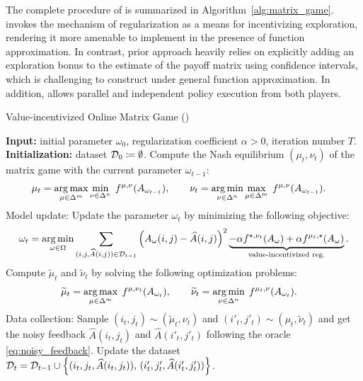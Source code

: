 The complete procedure of \name is summarized in Algorithm~\ref{alg:matrix_game}. \name invokes the mechanism of regularization as a means for incentivizing exploration, rendering it more amenable to implement in the presence of function approximation. In contrast, prior approach \citep{o2021matrix} heavily relies on 
explicitly adding an exploration bonus to the estimate of the payoff matrix using confidence intervals, which is challenging to construct under general function approximation. In addition, \name allows parallel and independent policy execution from both players.


 
\begin{algorithm}[th]
    \caption{Value-incentivized Online Matrix Game (\name)}
    \label{alg:matrix_game}
    \begin{algorithmic}[1]
    \STATE \textbf{Input:}  initial parameter $\omega_0$, regularization coefficient $\alpha>0$, iteration number $T$.  
    \STATE \textbf{Initialization:} dataset ${\mathcal{D}}_0\coloneqq \emptyset$.
    \STATE 
    Compute the Nash equilibrium $(\mu_t,\nu_t)$ of  the matrix game with the current parameter $\omega_{t-1}$:
    \begin{align}\label{eq:policy_update}
        \mu_t&=\operatorname*{arg\,max}_{\mu\in\Delta^m}\min_{\nu\in\Delta^n}\; f^{\mu,\nu}(A_{\omega_{t-1}}),\qquad \nu_t=\operatorname*{arg\,min}_{\nu\in\Delta^n}\max_{\mu\in\Delta^m}\; f^{\mu,\nu}(A_{\omega_{t-1}}).
    \end{align} 
    \STATE Model update: Update the parameter $\omega_t$ by minimizing the following objective:
    \begin{align}\label{eq:model_update}
        \omega_t=\operatorname*{arg\,min}_{\omega\in\Omega}\sum_{(i,j,\widehat{A}(i,j))\in{\mathcal{D}}_{t-1}}\left(A_\omega(i,j)-\widehat{A}(i,j)\right)^2  \underbrace{ -\alpha f^{\star, \nu_t}(A_{\omega})+\alpha f^{\mu_t,\star}(A_{\omega})}_{\textrm{value-incentivized~reg.}}.
    \end{align}
    \STATE Compute $\widetilde{\mu}_t$ and $\widetilde{\nu}_t$ by solving the following optimization problems:
    \begin{align}\label{eq:policy_update_2}
        \widetilde{\mu}_t& = \operatorname*{arg\,max}_{\mu\in\Delta^m}\; f^{\mu,\nu_t}(A_{\omega_t}),\qquad \widetilde{\nu}_t = \operatorname*{arg\,min}_{\nu\in\Delta^n}\; f^{\mu_t,\nu}(A_{\omega_t}).
    \end{align}
    \STATE Data collection: Sample $(i_t,j_t)\sim (\widetilde{\mu}_t,\nu_t)$ and $(i'_t,j'_t)\sim (\mu_t,\widetilde{\nu}_t)$ and get the noisy feedback $\widehat{A}(i_t,j_t)$ and $\widehat{A}(i'_t,j'_t)$ following the oracle \eqref{eq:noisy_feedback}. Update the dataset ${{\mathcal{D}}}_t={\mathcal{D}}_{t-1}\cup\left\{ (i_t,j_t,\widehat{A}(i_t,j_t) ), \, (i'_t,j'_t,\widehat{A}(i'_t,j'_t) )\right\}$.
    \ENDFOR 
    \end{algorithmic}
\end{algorithm}

